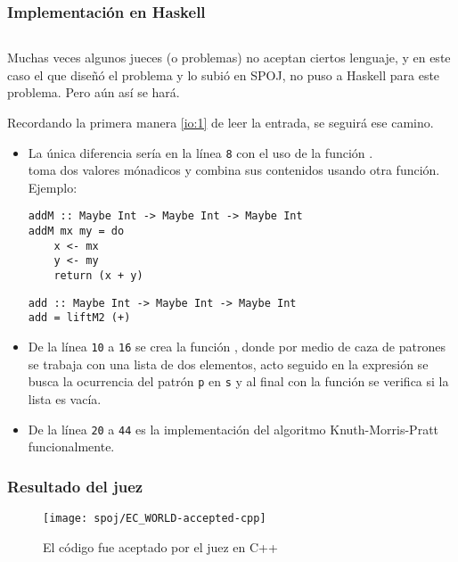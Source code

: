 \newpage

\subsubsection{Implementación en Haskell}
\inputminted[linenos, frame=lines]{haskell}{problemas/haskell/EC_WORLD.hs}

Muchas veces algunos jueces (o problemas) no aceptan ciertos lenguaje, y en este caso el que
diseñó el problema y lo subió en SPOJ, no puso a Haskell para este problema. Pero aún así se hará.

Recordando la primera manera \ref{io:1} de leer la entrada, se seguirá ese camino.

\begin{itemize}
\item La única diferencia sería en la línea \texttt{8} con el uso de la función .\\
 toma dos valores mónadicos y
combina sus contenidos usando otra función. Ejemplo:
\begin{verbatim}
addM :: Maybe Int -> Maybe Int -> Maybe Int
addM mx my = do
    x <- mx
    y <- my
    return (x + y)
\end{verbatim}

\begin{verbatim}
add :: Maybe Int -> Maybe Int -> Maybe Int
add = liftM2 (+)
\end{verbatim}

\item De la línea \texttt{10} a \texttt{16} se crea la función 
, donde por medio de caza de patrones se 
trabaja con una lista de dos elementos, acto seguido en la expresión 
 se busca la ocurrencia
del patrón \texttt{p} en \texttt{s} y al final con la función
 se verifica si la lista es vacía.  

\item De la línea \texttt{20} a \texttt{44} es la implementación del algoritmo 
Knuth-Morris-Pratt funcionalmente.
\end{itemize}

\subsubsection{Resultado del juez}
\begin{figure}[H]
\centering
\texttt{[image: spoj/EC\_WORLD-accepted-cpp]}
\caption{El código fue aceptado por el juez en C++}
\end{figure}

